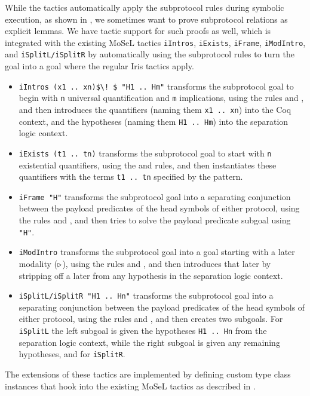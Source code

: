 While the \lname tactics automatically apply the subprotocol rules during
symbolic execution, as shown in ,
we sometimes want to prove subprotocol relations as explicit lemmas.
We have tactic support for such proofs as well, which is integrated with the
existing MoSeL tactics
\lstinline{iIntros}, \lstinline{iExists}, \lstinline{iFrame}, \lstinline{iModIntro},
and \lstinline{iSplitL/iSplitR} by automatically using the subprotocol rules to
turn the goal into a goal where the regular Iris tactics apply.
\begin{itemize}
\item \lstinline{iIntros (x1 .. xn)$\! $ "H1 .. Hm"}
  transforms the subprotocol goal to
  begin with \lstinline{n} universal quantification and \lstinline{m} implications, using the rules
   and ,
  and then introduces the quantifiers (naming them \lstinline{x1 .. xn}) into the
  Coq context, and the hypotheses (naming them \lstinline{H1 .. Hm}) into the
  separation logic context.
\item \lstinline{iExists (t1 .. tn)} transforms the subprotocol goal to start with
  \lstinline{n} existential quantifiers, using the
   and  rules,
  and then instantiates these quantifiers with the terms \lstinline{t1 .. tn} specified by the pattern.
\item \lstinline{iFrame "H"} transforms the subprotocol goal into a separating
  conjunction between the payload predicates of the head symbols of either
  protocol, using the rules
   and ,
  and then tries to solve the payload predicate subgoal using \lstinline|"H"|.
\item \lstinline{iModIntro} transforms the subprotocol goal into a
  goal starting with a later modality ($\mathop{{\triangleright}}$), using the rules
   and ,
  and then introduces that later by stripping off a later from any hypothesis
  in the separation logic context.
\item \lstinline{iSplitL/iSplitR "H1 .. Hn"} transforms the subprotocol goal into a
  separating conjunction between the payload predicates of the head symbols of either
  protocol, using the rules
   and ,
  and then creates two subgoals.
  For \lstinline{iSplitL} the left subgoal is given the hypotheses
  \lstinline{H1 .. Hn} from the separation logic context,
  while the right subgoal is given any remaining hypotheses, and \viceversa for
  \lstinline{iSplitR}.
\end{itemize}
The extensions of these tactics are implemented by defining custom type class
instances that hook into the existing MoSeL tactics as described in \cite{krebbers-POPL2017}.

